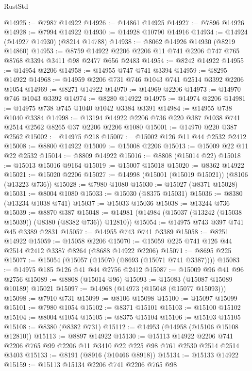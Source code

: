 \begin{lexlean}{RustStd}
\begin{coremodule}
{\begin{coremodule}
{{{{{{{{{{{{{{{{{{{{{{{{{{{{{{{{{{{{{{{{{{{{{{{{{{@14925 := @7987 @14922
@14926 := @14861 @14925
@14927 := @7896 @14926
@14928 := @7994 @14922
@14930 := @14928 @10790 @14916
@14934 := @14924 (@14927 @14930) (@8214 @14788)
@14938 := @8062 @14926 @14930 (@8219 @14860)
@14953 := @8759 @14922 @2206 @2206 @11 @741 @2206 @747 @765 @8768 @3394 @3411 @98 @2477 @656 @2483
@14954 := @8242 @14922
@14955 := @14954 @2206
@14958 := @14955 @747 @741 @3394
@14959 := @8295 @14922
@14968 := @14959 @2206 @731 @746 @1043 @741 @2514 @3392 @2206 @1054
@14969 := @8271 @14922
@14970 := @14969 @2206
@14973 := @14970 @746 @1043 @3392
@14974 := @8280 @14922
@14975 := @14974 @2206
@14981 := @14975 @738 @745 @1040 @1042 @3384 @3391
@14984 := @14955 @738 @1040 @3384
@14998 := @13194 @14922 @2206 @736 @220 @387 @1038 @741 @2514 @2562 @8265 @37 @2206 @2206 @1080
@15001 := @14970 @220 @387 @2562
@15002 := @14975 @218
@15007 := @15002 @126 @11 @44 @2532 @2412
@15008 := @8800 @14922
@15009 := @15008 @2206
@15013 := @15009 @22 @11 @22 @2532
@15014 := @8809 @14922
@15016 := @8808 (@15014 @22)
@15018 := @15013 @15016 @9164
@15019 := @15007 @15018
@15020 := @8362 @14922
@15021 := @15020 @2206
@15027 := @14998 (@15001 (@15019 @15021)) (@8106 (@13223 @736))
@15028 := @7980 @1080
@15030 := @15027 (@8371 @15028)
@15031 := @8004 @1080
@15033 := @15030 (@8375 @15031)
@15036 := @8380 (@13234 @1038 @741)
@15037 := @15033 @15036
@15038 := @13244 @736
@15039 := @8870 @387
@15048 := @14981 (@14984 (@15037 (@13242 (@15038 @15039)) (@8380 (@8382 @736)) @12810))
@15054 := @14975 @743 @397 @741 @45 @3389 @2831
@15057 := @14955 @743 @741 @3389
@15058 := @8251 @14922
@15059 := @15058 @2206
@15070 := @15059 @225 @741 @126 @44 @2514 @2412 @3387 @8264 (@8688 @14922 @2206)
@15071 := @8695 @225
@15077 := @15054 (@15057 (@15070 (@8693 (@15071 @741 @3387))))
@15083 := @14975 @185 @126 @41 @44 @2756 @2412
@15087 := @15009 @96 @41 @96 @2756
@15089 := @8808 (@15014 @96)
@15093 := @15083 (@15087 @15089 @10189) @15021
@15097 := @14968 (@14973 (@15048 (@15077 @15093)))
@15098 := @7910 @731
@15099 := @8106 @15098
@15100 := @15097 @15099
@15101 := @7980 @1054
@15102 := @8371 @15101
@15103 := @15100 @15102
@15104 := @8004 @1054
@15105 := @8375 @15104
@15106 := @15103 @15105
@15108 := @8380 (@8382 @731)
@15112 := @14953 (@14958 (@15106 @15108 @12810))
@15113 := @8897 @14922
@15130 := @15113
    @14922
    @2206
    @741
    @2206
    @765
    @99
    @2206
    @11
    @3410
    @22
    @225
    @98
    @761
    @2530
    @2514
    @2514
    @3403
@15133 := @8191 (@8916 (@10466 @8918))
@15134 := @15133 @14922
@15159 := @15113
    @15134
    @2206
    @741
    @2206
    @765
    @98
}}}}}}}}}}}}}}}}}}}}}}}}}}}}}}}}}}}}}}}}}}}}}}}}}}
\end{coremodule}}
\end{coremodule}
\end{lexlean}
